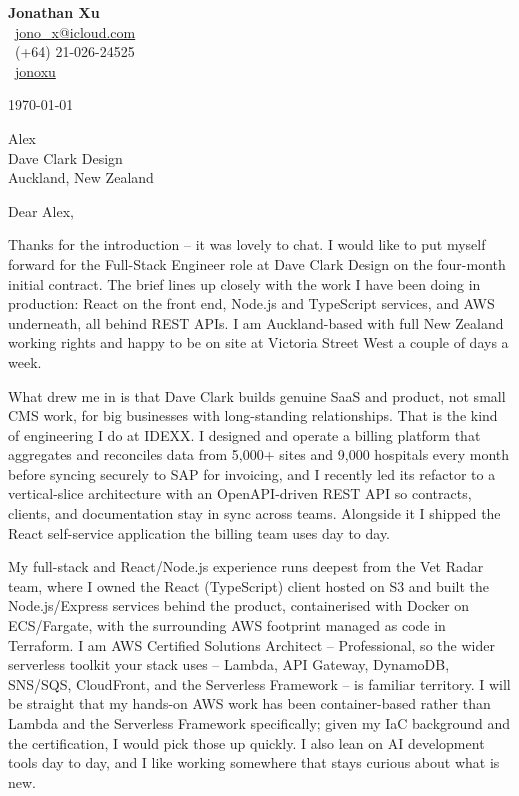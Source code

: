 \documentclass[11pt,a4paper]{article}
\begin{document}
\begin{flushright}
{\Large\textbf{Jonathan Xu}}\\[0.3em]
\faEnvelope\ \href{mailto:jono_x@icloud.com}{jono\_x@icloud.com} \\
\faPhone\ (+64) 21-026-24525 \\
\faLinkedin\ \href{https://www.linkedin.com/in/jonathan-x-4aba55115}{jonoxu}
\end{flushright}

\vspace{0.5em}

\today

\vspace{0.5em}

Alex \\
Dave Clark Design \\
Auckland, New Zealand

\vspace{0.5em}

Dear Alex,

Thanks for the introduction -- it was lovely to chat. I would like to put myself forward for the Full-Stack Engineer role at Dave Clark Design on the four-month initial contract. The brief lines up closely with the work I have been doing in production: React on the front end, Node.js and TypeScript services, and AWS underneath, all behind REST APIs. I am Auckland-based with full New Zealand working rights and happy to be on site at Victoria Street West a couple of days a week.

What drew me in is that Dave Clark builds genuine SaaS and product, not small CMS work, for big businesses with long-standing relationships. That is the kind of engineering I do at IDEXX. I designed and operate a billing platform that aggregates and reconciles data from 5,000+ sites and 9,000 hospitals every month before syncing securely to SAP for invoicing, and I recently led its refactor to a vertical-slice architecture with an OpenAPI-driven REST API so contracts, clients, and documentation stay in sync across teams. Alongside it I shipped the React self-service application the billing team uses day to day.

My full-stack and React/Node.js experience runs deepest from the Vet Radar team, where I owned the React (TypeScript) client hosted on S3 and built the Node.js/Express services behind the product, containerised with Docker on ECS/Fargate, with the surrounding AWS footprint managed as code in Terraform. I am AWS Certified Solutions Architect -- Professional, so the wider serverless toolkit your stack uses -- Lambda, API Gateway, DynamoDB, SNS/SQS, CloudFront, and the Serverless Framework -- is familiar territory. I will be straight that my hands-on AWS work has been container-based rather than Lambda and the Serverless Framework specifically; given my IaC background and the certification, I would pick those up quickly. I also lean on AI development tools day to day, and I like working somewhere that stays curious about what is new.
\end{document}
